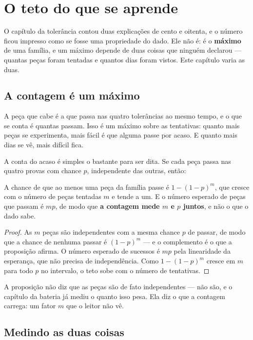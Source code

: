 \chapter{O teto do que se aprende}\label{cap:teto}

O capítulo da tolerância contou duas explicações de cento e oitenta, e o número ficou impresso como
se fosse uma propriedade do dado. Ele não é: é o \textbf{máximo} de uma família, e um máximo depende de
duas coisas que ninguém declarou --- quantas peças foram tentadas e quantos dias foram vistos. Este
capítulo varia as duas.

\section{A contagem é um máximo}

A peça que cabe é a que passa nas quatro tolerâncias ao mesmo tempo, e o que se conta é quantas
passam. Isso é um máximo sobre as tentativas: quanto mais peças se experimenta, mais fácil é que
alguma passe por acaso. E quanto mais dias se vê, mais difícil fica.

A conta do acaso é simples o bastante para ser dita. Se cada peça passa nas quatro provas com
chance $p$, independente das outras, então:

\begin{proposicao}\label{prop:teto-tentativas}
A chance de que ao menos uma peça da família passe é $1-(1-p)^{m}$, que cresce com o número de
peças tentadas $m$ e tende a um. E o número esperado de peças que passam é $mp$, de modo que
\textbf{a contagem mede $m$ e $p$ juntos}, e não o que o dado sabe.
\end{proposicao}

\begin{proof}
As $m$ peças são independentes com a mesma chance $p$ de passar, de modo que a chance de nenhuma
passar é $(1-p)^{m}$ --- e o complemento é o que a proposição afirma. O número esperado de sucessos
é $mp$ pela linearidade da esperança, que não precisa de independência. Como $1-(1-p)^{m}$ cresce em
$m$ para todo $p$ no intervalo, o teto sobe com o número de tentativas.
\end{proof}

A proposição não diz que as peças são de fato independentes --- não são, e o capítulo da bateria já
mediu o quanto isso pesa. Ela diz o que a contagem carrega: um fator $m$ que o leitor não vê.

\section{Medindo as duas coisas}


